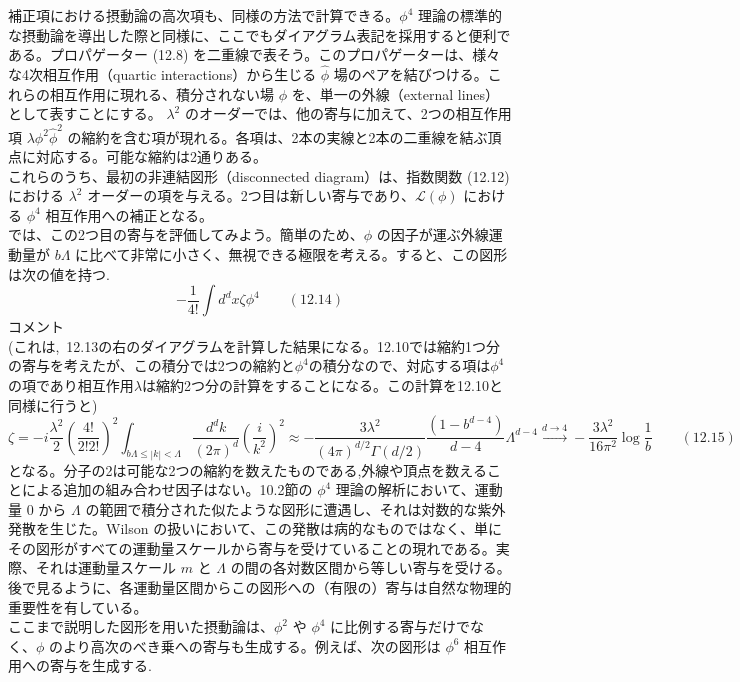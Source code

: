 \documentclass[uplatex,dvipdfmx]{jsarticle}
\begin{document}
補正項における摂動論の高次項も、同様の方法で計算できる。$\phi^4$ 理論の標準的な摂動論を導出した際と同様に、ここでもダイアグラム表記を採用すると便利である。プロパゲーター (12.8) を二重線で表そう。このプロパゲーターは、様々な4次相互作用（quartic interactions）から生じる $\hat{\phi}$ 場のペアを結びつける。これらの相互作用に現れる、積分されない場 $\phi$ を、単一の外線（external lines）として表すことにする。
$\lambda^2$ のオーダーでは、他の寄与に加えて、2つの相互作用項 $\lambda\phi^2\hat{\phi}^2$ の縮約を含む項が現れる。各項は、2本の実線と2本の二重線を結ぶ頂点に対応する。可能な縮約は2通りある。\\
これらのうち、最初の非連結図形（disconnected diagram）は、指数関数 (12.12) における $\lambda^2$ オーダーの項を与える。2つ目は新しい寄与であり、$\mathcal{L}(\phi)$ における $\phi^4$ 相互作用への補正となる。\\
では、この2つ目の寄与を評価してみよう。簡単のため、$\phi$ の因子が運ぶ外線運動量が $b\Lambda$ に比べて非常に小さく、無視できる極限を考える。すると、この図形は次の値を持つ.
\begin{equation}
    -\frac{1}{4!} \int d^dx \zeta \phi^4 \qquad (12.14)
\end{equation}
コメント\\
(これは,~12.13の右のダイアグラムを計算した結果になる。12.10では縮約1つ分の寄与を考えたが、この積分では2つの縮約と$\phi^4$の積分なので、対応する項は$\phi^4$の項であり相互作用$\lambda$は縮約2つ分の計算をすることになる。この計算を12.10と同様に行うと)
\begin{equation}
    \zeta = -i \frac{\lambda^2}{2} \left(\frac{4!}{2!2!} \right)^2 \int_{b\Lambda \le |k| < \Lambda} \frac{d^dk}{(2\pi)^d} \left( \frac{i}{k^2} \right)^2 \approx -\frac{3\lambda^2}{(4\pi)^{d/2}\Gamma(d/2)} \frac{(1-b^{d-4})}{d-4} \Lambda^{d-4} \xrightarrow{d\to4} -\frac{3\lambda^2}{16\pi^2} \log \frac{1}{b} \qquad (12.15)
\end{equation}
となる。分子の2は可能な2つの縮約を数えたものである,外線や頂点を数えることによる追加の組み合わせ因子はない。10.2節の $\phi^4$ 理論の解析において、運動量 0 から $\Lambda$ の範囲で積分された似たような図形に遭遇し、それは対数的な紫外発散を生じた。Wilson の扱いにおいて、この発散は病的なものではなく、単にその図形がすべての運動量スケールから寄与を受けていることの現れである。実際、それは運動量スケール $m$ と $\Lambda$ の間の各対数区間から等しい寄与を受ける。後で見るように、各運動量区間からこの図形への（有限の）寄与は自然な物理的重要性を有している。\\
ここまで説明した図形を用いた摂動論は、$\phi^2$ や $\phi^4$ に比例する寄与だけでなく、$\phi$ のより高次のべき乗への寄与も生成する。例えば、次の図形は $\phi^6$ 相互作用への寄与を生成する.
\end{document}
